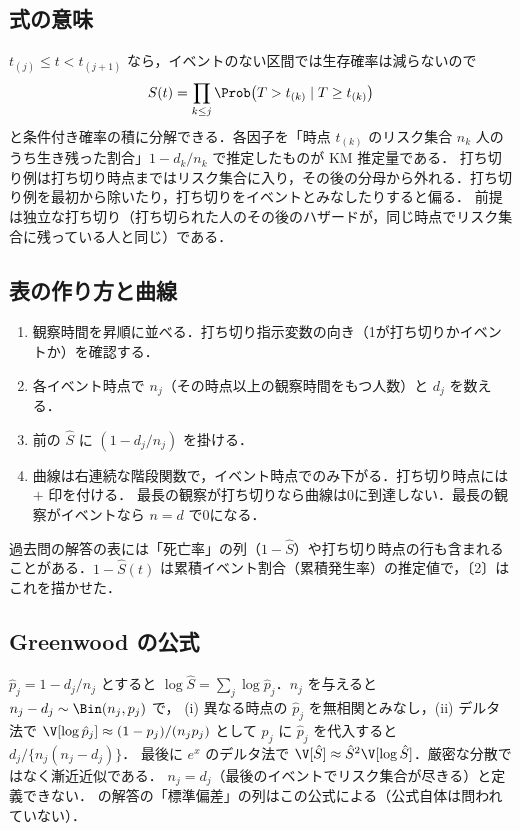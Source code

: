 \subsection{式の意味}
$t_{(j)}\le t<t_{(j+1)}$ なら，イベントのない区間では生存確率は減らないので
\[
S(t)=\prod_{k\le j}\Prob\bigl(T>t_{(k)}\mid T\ge t_{(k)}\bigr)
\]
と条件付き確率の積に分解できる．各因子を「時点 $t_{(k)}$ のリスク集合 $n_k$ 人のうち生き残った割合」$1-d_k/n_k$ で推定したものが KM 推定量である．
打ち切り例は打ち切り時点まではリスク集合に入り，その後の分母から外れる．打ち切り例を最初から除いたり，打ち切りをイベントとみなしたりすると偏る．
前提は独立な打ち切り（打ち切られた人のその後のハザードが，同じ時点でリスク集合に残っている人と同じ）である．

\subsection{表の作り方と曲線}
\begin{enumerate}
\item 観察時間を昇順に並べる．打ち切り指示変数の向き（1が打ち切りかイベントか）を確認する．
\item 各イベント時点で $n_j$（その時点以上の観察時間をもつ人数）と $d_j$ を数える．
\item 前の $\hat S$ に $(1-d_j/n_j)$ を掛ける．
\item 曲線は右連続な階段関数で，イベント時点でのみ下がる．打ち切り時点には $+$ 印を付ける．
      最長の観察が打ち切りなら曲線は0に到達しない．最長の観察がイベントなら $n=d$ で0になる．
\end{enumerate}
過去問の解答の表には「死亡率」の列（$1-\hat S$）や打ち切り時点の行も含まれることがある．$1-\hat S(t)$ は累積イベント割合（累積発生率）の推定値で，〔2〕はこれを描かせた．

\subsection{Greenwood の公式}
$\hat p_j=1-d_j/n_j$ とすると $\log\hat S=\sum_j\log\hat p_j$．$n_j$ を与えると $n_j-d_j\sim\Bin(n_j,p_j)$ で，
(i) 異なる時点の $\hat p_j$ を無相関とみなし，(ii) デルタ法で $\V[\log\hat p_j]\approx(1-p_j)/(n_jp_j)$ として $p_j$ に $\hat p_j$ を代入すると $d_j/\{n_j(n_j-d_j)\}$．
最後に $e^x$ のデルタ法で $\V[\hat S]\approx\hat S^2\V[\log\hat S]$．厳密な分散ではなく漸近近似である．
$n_j=d_j$（最後のイベントでリスク集合が尽きる）と定義できない．
 の解答の「標準偏差」の列はこの公式による（公式自体は問われていない）．

